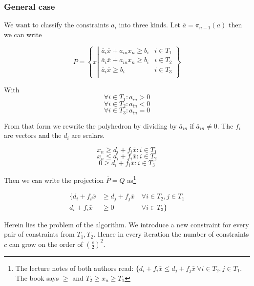 \subsubsection*{General case}
We want to classify the constraints $a_i$ into three kinds. Let $\overline a = \pi_{n-1}(a)$ then we can write  

\[P=\left\{x\left| \begin{array}{cr}
\overline a_i\overline x +a_{in}x_n \geq b_i & i\in T_1\\
\overline a_i\overline x +a_{in}x_n \geq b_i & i\in T_2\\
\overline a_i\overline x \geq b_i & i\in T_3\\
\end{array}\right.\right\}\]

With 
$$\forall i\in T_1: a_{in}>0$$ $$\forall i\in T_2: a_{in}<0$$ $$ \forall i\in T_3: a_{in}=0 $$

From that form we rewrite the polyhedron by dividing by $\overline a_{in}$ if $\overline a_{in}\neq 0$. The $f_i$ are vectors and the $d_i$ are scalars. 

\begin{equation}\label{For:Motz1}x_n \geq  d_i + f_i \bar x : i \in T_1 \end{equation}
\begin{equation}\label{For:Motz2}x_n \leq  d_i+f_i \bar x : i \in T_2 \end{equation}
\begin{equation}\label{For:Motz3}0 \geq  d_i+f_i \bar x : i \in T_3 \end{equation}


Then we can write the projection $\overline P=Q$ as\footnote{The lecture notes of both authors read: $\{d_i+f_i\bar x \leq d_j+f_j\bar x\ \forall i\in T_2, j\in T_1 $. The book says $\geq$ and $T_2\geq x_n \geq T_1$}

\begin{eqnarray*}
\{d_i+f_i\bar x & \geq d_j+f_j\bar x\ & \forall i\in T_2, j\in T_1  \\
d_i+f_i\bar x & \geq 0\ & \forall i\in T_3\}
\end{eqnarray*}


Herein lies the problem of the algorithm. We introduce a new constraint for every pair of constraints from $T_1,T_2$. Hence in every iteration the number of constraints $c$ can grow on the order of $(\frac{c}{2})^2$.

